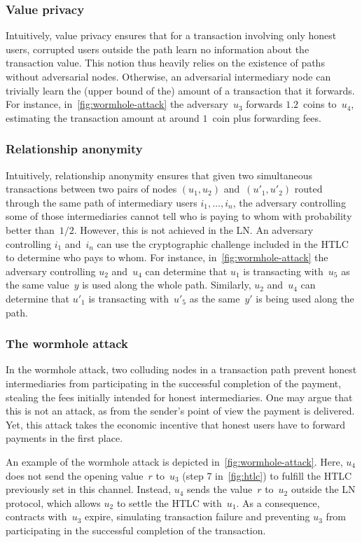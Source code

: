 \subsubsection*{Value privacy}
Intuitively, value privacy ensures that for a transaction involving only honest users, corrupted users outside the path learn no information about the transaction value.
This notion thus heavily relies on the existence of paths without adversarial nodes.
Otherwise, an adversarial intermediary node can trivially learn the (upper bound of the) amount of a transaction that it forwards.
For instance, in~\cref{fig:wormhole-attack} the adversary~$u_3$ forwards $1.2$~coins to~$u_4$, estimating the transaction amount at around $1$~coin plus forwarding fees.

\subsubsection*{Relationship anonymity}
Intuitively, relationship anonymity ensures that given two simultaneous transactions between two pairs of nodes $(u_1, u_2)$ and~$(u'_1, u'_2)$ routed through the same path of intermediary users $i_1, \ldots, i_n$, the adversary controlling some of those intermediaries cannot tell who is paying to whom with probability better than~$1/2$.
However, this is not achieved in the LN\@.
An adversary controlling $i_1$ and~$i_n$ can use the cryptographic challenge included in the HTLC to determine who pays to whom.
For instance, in~\cref{fig:wormhole-attack} the adversary controlling $u_2$ and~$u_4$ can determine that $u_1$ is transacting with~$u_5$ as the same value~$y$ is used along the whole path.
Similarly, $u_2$ and~$u_4$ can determine that $u'_1$ is transacting with~$u'_5$ as the same~$y'$ is being used along the path.

\subsubsection*{The wormhole attack}
In the wormhole attack, two colluding nodes in a transaction path prevent honest intermediaries from participating in the successful completion of the payment, stealing the fees initially intended for honest intermediaries.
One may argue that this is not an attack, as from the sender's point of view the payment is delivered.
Yet, this attack takes the economic incentive that honest users have to forward payments in the first place.

An example of the wormhole attack is depicted in~\cref{fig:wormhole-attack}.
Here, $u_4$ does not send the opening value~$r$ to~$u_3$ (step 7 in~\cref{fig:htlc}) to fulfill the HTLC previously set in this channel.
Instead, $u_4$ sends the value~$r$ to~$u_2$ outside the LN protocol, which allows $u_2$ to settle the HTLC with~$u_1$.
As a consequence, contracts with~$u_3$ expire, simulating transaction failure and preventing $u_3$ from participating in the successful completion of the transaction.


